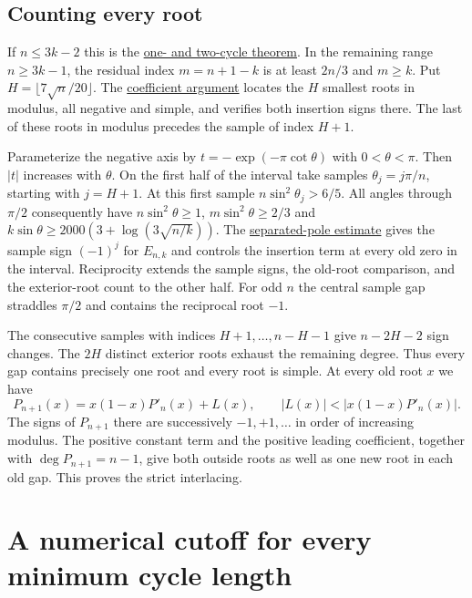 \subsection{Counting every root}

If $n\le3k-2$ this is the \href{https://github.com/ProgramComputer/open-math-research/blob/main/topics/long-cycle-excedances/two-cycle-band.md}{one- and two-cycle theorem}. In the remaining range $n\ge3k-1$, the residual index $m=n+1-k$ is at least $2n/3$ and $m\ge k$. Put $H=\lfloor7\sqrt n/20\rfloor$. The \href{https://github.com/ProgramComputer/open-math-research/blob/main/topics/long-cycle-excedances/effective-front.md}{coefficient argument} locates the $H$ smallest roots in modulus, all negative and simple, and verifies both insertion signs there. The last of these roots in modulus precedes the sample of index $H+1$.

Parameterize the negative axis by $t=-\exp(-\pi\cot\theta)$ with $0<\theta<\pi$. Then $|t|$ increases with $\theta$. On the first half of the interval take samples $\theta_j=j\pi/n$, starting with $j=H+1$. At this first sample $n\sin^2\theta_j>6/5$. All angles through $\pi/2$ consequently have $n\sin^2\theta\ge1$, $m\sin^2\theta\ge2/3$ and $k\sin\theta\ge2000(3+\log(3\sqrt{n/k}))$. The \href{https://github.com/ProgramComputer/open-math-research/blob/main/topics/long-cycle-excedances/separated-poles.md}{separated-pole estimate} gives the sample sign $(-1)^j$ for $E_{n,k}$ and controls the insertion term at every old zero in the interval. Reciprocity extends the sample signs, the old-root comparison, and the exterior-root count to the other half. For odd $n$ the central sample gap straddles $\pi/2$ and contains the reciprocal root $-1$.

The consecutive samples with indices $H+1,\dots,n-H-1$ give $n-2H-2$ sign changes. The $2H$ distinct exterior roots exhaust the remaining degree. Thus every gap contains precisely one root and every root is simple. At every old root $x$ we have
\[
P_{n+1}(x)=x(1-x)P'_n(x)+L(x),\qquad
|L(x)|<|x(1-x)P'_n(x)|.
\]
The signs of $P_{n+1}$ there are successively $-1,+1,\dots$ in order of increasing modulus. The positive constant term and the positive leading coefficient, together with $\deg P_{n+1}=n-1$, give both outside roots as well as one new root in each old gap. This proves the strict interlacing.

\section{A numerical cutoff for every minimum cycle length}

